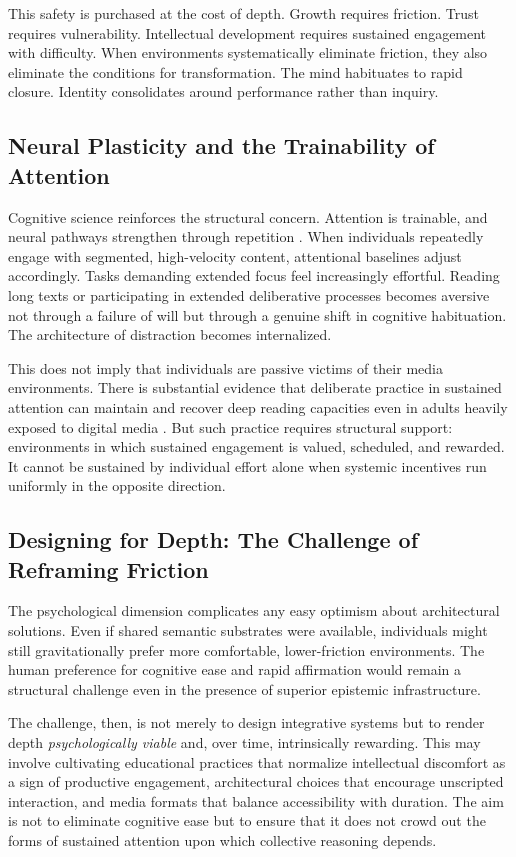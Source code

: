 \documentclass[11pt]{article}
\begin{document}
This safety is purchased at the cost of depth. Growth requires friction. Trust requires vulnerability. Intellectual development requires sustained engagement with difficulty. When environments systematically eliminate friction, they also eliminate the conditions for transformation. The mind habituates to rapid closure. Identity consolidates around performance rather than inquiry.

\subsection{Neural Plasticity and the Trainability of Attention}

Cognitive science reinforces the structural concern. Attention is trainable, and neural pathways strengthen through repetition \citep{Carr2010, Wolf2018}. When individuals repeatedly engage with segmented, high-velocity content, attentional baselines adjust accordingly. Tasks demanding extended focus feel increasingly effortful. Reading long texts or participating in extended deliberative processes becomes aversive not through a failure of will but through a genuine shift in cognitive habituation. The architecture of distraction becomes internalized.

This does not imply that individuals are passive victims of their media environments. There is substantial evidence that deliberate practice in sustained attention can maintain and recover deep reading capacities even in adults heavily exposed to digital media \citep{Wolf2018}. But such practice requires structural support: environments in which sustained engagement is valued, scheduled, and rewarded. It cannot be sustained by individual effort alone when systemic incentives run uniformly in the opposite direction.

\subsection{Designing for Depth: The Challenge of Reframing Friction}

The psychological dimension complicates any easy optimism about architectural solutions. Even if shared semantic substrates were available, individuals might still gravitationally prefer more comfortable, lower-friction environments. The human preference for cognitive ease and rapid affirmation would remain a structural challenge even in the presence of superior epistemic infrastructure.

The challenge, then, is not merely to design integrative systems but to render depth \emph{psychologically viable} and, over time, intrinsically rewarding. This may involve cultivating educational practices that normalize intellectual discomfort as a sign of productive engagement, architectural choices that encourage unscripted interaction, and media formats that balance accessibility with duration. The aim is not to eliminate cognitive ease but to ensure that it does not crowd out the forms of sustained attention upon which collective reasoning depends.
\end{document}
